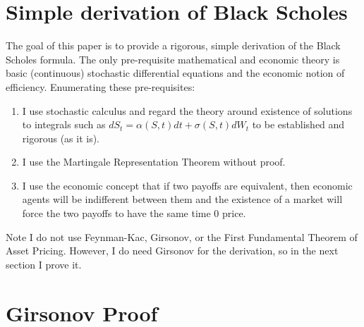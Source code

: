 \documentclass{article}
\begin{document}
\section{Simple derivation of Black Scholes}

The goal of this paper is to provide a rigorous, simple derivation of the Black Scholes formula.  The only pre-requisite mathematical and economic theory is basic (continuous) stochastic differential equations and the economic notion of efficiency.  Enumerating these pre-requisites:
\begin{enumerate}
	\item I use stochastic calculus and regard the theory around existence of solutions to integrals such as \(dS_t=\alpha(S, t)dt+\sigma(S, t)dW_t\) to be established and rigorous (as it is).
	\item I use the Martingale Representation Theorem without proof.
	\item I use the economic concept that if two payoffs are equivalent, then economic agents will be indifferent between them and the existence of a market will force the two payoffs to have the same time \(0\) price.
\end{enumerate}

Note I do not use Feynman-Kac, Girsonov, or the First Fundamental Theorem of Asset Pricing.  However, I do need Girsonov for the derivation, so in the next section I prove it.

\section{Girsonov Proof}
\end{document}

